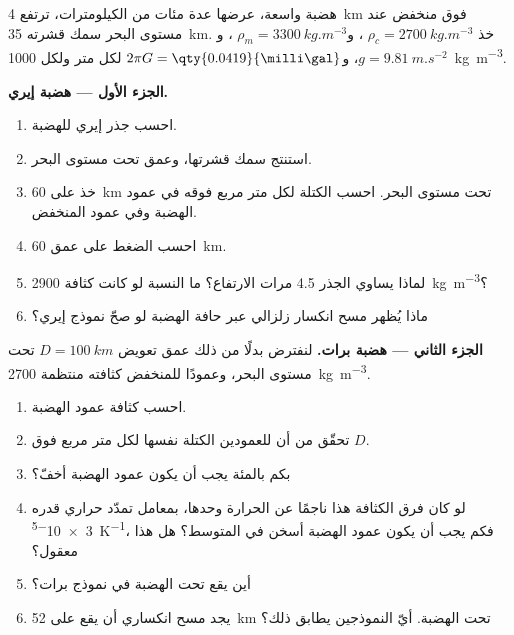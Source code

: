 \begin{problem}
\label{pb:b1:isostasy-gravity:1}
هضبة واسعة، عرضها عدة مئات من الكيلومترات، ترتفع \qty{4}{km} فوق منخفض عند مستوى البحر سمك قشرته \qty{35}{km}. خذ $\rho_c = \qty{2700}{kg.m^{-3}}$ ، و$\rho_m = \qty{3300}{kg.m^{-3}}$ ، و$g = \qty{9.81}{m.s^{-2}}$، و$2\pi G = \qty{0.0419}{\milli\gal}$ لكل متر ولكل \qty{1000}{kg.m^{-3}}.

\medskip
\noindent\textbf{الجزء الأول --- هضبة إيري.}
\begin{enumerate}
  \item احسب جذر إيري للهضبة.
  \item استنتج سمك قشرتها، وعمق  تحت مستوى البحر.
  \item خذ  على \qty{60}{km} تحت مستوى البحر. احسب الكتلة لكل متر مربع فوقه في عمود الهضبة وفي عمود المنخفض.
  \item احسب الضغط على عمق \qty{60}{km}.
  \item لماذا يساوي الجذر \num{4.5} مرات الارتفاع؟ ما النسبة لو كانت كثافة  \qty{2900}{kg.m^{-3}}؟
  \item ماذا يُظهر مسح انكسار زلزالي عبر حافة الهضبة لو صحّ نموذج إيري؟
\end{enumerate}

\noindent\textbf{الجزء الثاني --- هضبة برات.}
لنفترض بدلًا من ذلك عمق تعويض $D = \qty{100}{km}$ تحت مستوى البحر، وعمودًا للمنخفض كثافته منتظمة \qty{2700}{kg.m^{-3}}.
\begin{enumerate}[resume]
  \item احسب كثافة عمود الهضبة.
  \item تحقّق من أن للعمودين الكتلة نفسها لكل متر مربع فوق $D$.
  \item بكم بالمئة يجب أن يكون عمود الهضبة أخفّ؟
  \item لو كان فرق الكثافة هذا ناجمًا عن الحرارة وحدها، بمعامل تمدّد حراري قدره \qty{3e-5}{K^{-1}}، فكم يجب أن يكون عمود الهضبة أسخن في المتوسط؟ هل هذا معقول؟
  \item أين يقع  تحت الهضبة في نموذج برات؟
  \item يجد مسح انكساري أن  يقع على \qty{52}{km} تحت الهضبة. أيّ النموذجين يطابق ذلك؟
\end{enumerate}


\end{problem}
